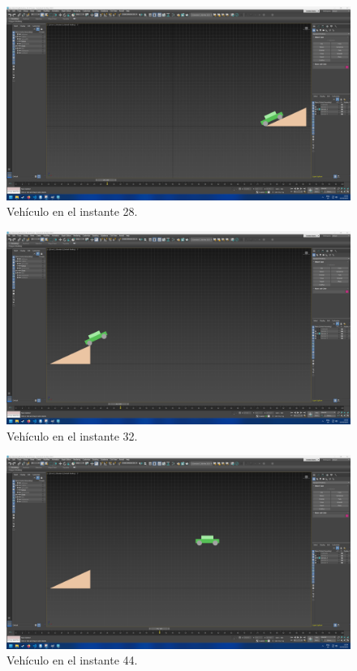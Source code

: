 \documentclass{article}
\begin{document}
 \begin{figure}[H]
    \centering
    \includegraphics[width=\textwidth]{imagenes/Ejercicio2/keyframes/28.png}
    \caption{Vehículo en el instante 28.}
 \end{figure}
 \begin{figure}[H]
    \centering
    \includegraphics[width=\textwidth]{imagenes/Ejercicio2/keyframes/32.png}
    \caption{Vehículo en el instante 32.}
 \end{figure}
 \begin{figure}[H]
    \centering
    \includegraphics[width=\textwidth]{imagenes/Ejercicio2/keyframes/44.png}
    \caption{Vehículo en el instante 44.}
 \end{figure}
\end{document}
